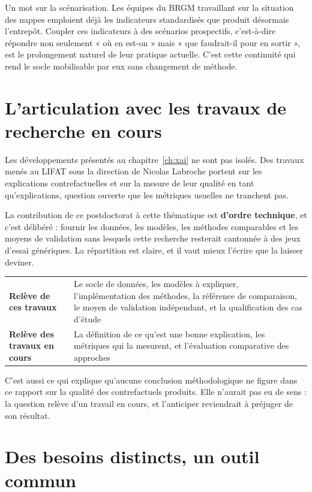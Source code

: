 Un mot sur la scénarisation. Les équipes du BRGM travaillant
sur la situation des nappes emploient déjà les indicateurs standardisés que produit désormais
l'entrepôt. Coupler ces indicateurs à des scénarios prospectifs, c'est-à-dire répondre non
seulement « où en est-on » mais « que faudrait-il pour en sortir », est le prolongement naturel
de leur pratique actuelle. C'est cette continuité qui rend le socle mobilisable par eux sans
changement de méthode.

\section{L'articulation avec les travaux de recherche en cours}

Les développements présentés au chapitre~\ref{ch:xai} ne sont pas isolés. Des travaux menés au
LIFAT sous la direction de Nicolas Labroche portent sur les explications contrefactuelles et sur
la mesure de leur qualité en tant qu'explications, question ouverte que les métriques usuelles ne
tranchent pas.

La contribution de ce postdoctorat à cette thématique est \textbf{d'ordre technique}, et c'est
délibéré : fournir les données, les modèles, les méthodes comparables et les moyens de
validation sans lesquels cette recherche resterait cantonnée à des jeux d'essai génériques. La
répartition est claire, et il vaut mieux l'écrire que la laisser deviner.

\begin{center}
\begin{tabularx}{\textwidth}{@{}lX@{}}
\toprule
\textbf{Relève de ces travaux} & Le socle de données, les modèles à expliquer, l'implémentation
des méthodes, la référence de comparaison, le moyen de validation indépendant, et la
qualification des cas d'étude \\
\textbf{Relève des travaux en cours} & La définition de ce qu'est une bonne explication, les
métriques qui la mesurent, et l'évaluation comparative des approches \\
\bottomrule
\end{tabularx}
\end{center}

C'est aussi ce qui explique qu'aucune conclusion méthodologique ne figure dans ce rapport sur la
qualité des contrefactuels produits. Elle n'aurait pas eu de sens : la question relève d'un
travail en cours, et l'anticiper reviendrait à préjuger de son résultat.

\section{Des besoins distincts, un outil commun}

